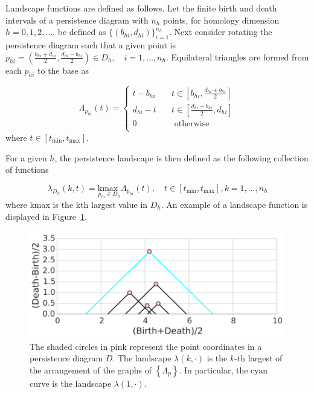 \documentclass[12pt]{article}
\begin{document}
Landscape functions are defined as follows.  Let the finite birth and death intervals of a persistence diagram with $n_h$ points, for homology dimension $h = 0, 1, 2, \ldots$, be defined as $\{(b_{hi},d_{hi})\}_{i = 1}^{n_h}$.  Next consider rotating the persistence diagram such that a given point is $p_{hi} = \left(\frac{b_{hi}+d_{hi}}{2}, \frac{d_{hi}-b_{hi}}{2}\right) \in D_h, \quad i = 1, \ldots, n_h$.  Equilateral triangles are formed from each $p_{hi}$ to the base as

\begin{equation*}
\Lambda_{p_{hi}}(t) =
  \begin{cases}
    t - b_{hi}  & \quad t \in [b_{hi}, \frac{d_{hi}+b_{hi}}{2}]\\
    d_{hi} - t  & \quad t \in [\frac{d_{hi}+b_{hi}}{2}, d_{hi}]\\
    0  & \quad \text{ otherwise}\\
  \end{cases}
\end{equation*}
where $t \in [t_{\min}, t_{\max}]$. 

For a given $h$, the persistence landscape is then defined as the following collection of functions

\begin{equation*}
\lambda_{D_h}(k, t) = \underset{p_{hi}\in D_h}{\text{kmax }} \Lambda_{p_{hi}}(t), \quad t \in [t_{\min}, t_{\max}], k = 1, \ldots, n_h
\end{equation*}
where kmax is the kth largest value in $D_h$.  An example of a landscape function is displayed in Figure~\ref{fig:landscape}.

\begin{center}
\begin{figure}[htp!]
  \centering
  \includegraphics[width=0.5\linewidth]{example_landscape.pdf}
    \caption{ The shaded circles in pink represent the point coordinates in a persistence diagram $D$. The landscape $\lambda(k, \cdot)$ is the $k$-th largest of the arrangement of the graphs of $\left \{ \Lambda_{p} \right \}$. In particular, the cyan curve is the landscape $\lambda(1, \cdot)$.}
    \label{fig:landscape}
\end{figure}
\end{center}
\end{document}
